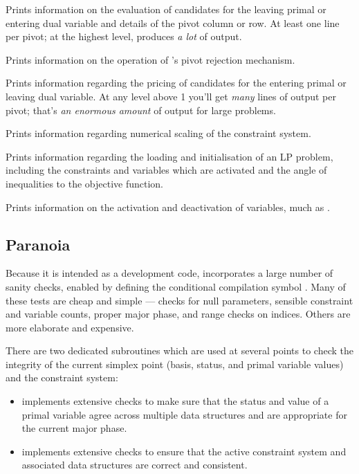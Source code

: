 \begin{codedoc}
  \item{}
  Prints information on the evaluation of candidates for the leaving primal
  or entering dual variable and details of the pivot column or row.
  At least one line per pivot; at the highest level, produces
  \textit{a lot} of output.

  \item{}
  Prints information on the operation of \dylp's pivot rejection mechanism.

  \item{}
  Prints information regarding the pricing of candidates for the entering
  primal or leaving dual variable.
  At any level above 1 you'll get \textit{many} lines of output per pivot;
  that's \textit{an enormous amount} of output for large problems.

  \item{}
  Prints information regarding numerical scaling of the constraint system.

  \item{}
  Prints information regarding the loading and initialisation of an LP problem,
  including the constraints and variables which are activated and the angle of
  inequalities to the objective function.

  \item{}
  Prints information on the activation and deactivation of variables, much as
  .
\end{codedoc}

\subsection{Paranoia}

Because it is intended as a development code, \dylp incorporates a large number
of sanity checks, enabled by defining the conditional compilation symbol
.
Many of these tests are cheap and simple --- checks for null parameters,
sensible constraint and variable counts, proper major phase, and range checks
on indices.
Others are more elaborate and expensive.

There are two dedicated subroutines which are used at several points to check
the integrity of the current simplex point (basis, status, and primal
variable values) and the constraint system:
\begin{itemize}
\item
{} implements extensive checks to make
sure that the status and value of a primal variable agree across multiple
data structures and are appropriate for the current major phase.

\item
{} implements extensive checks to ensure that the
active constraint system and associated data structures are correct and
consistent.
\end{itemize}

